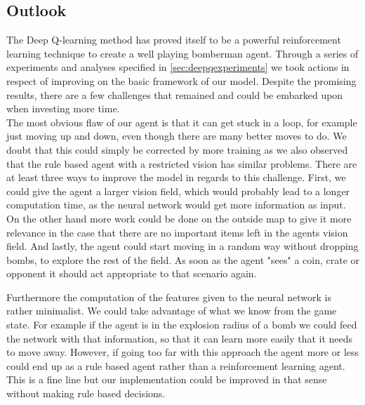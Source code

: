 
\subsection{Outlook}

The Deep Q-learning method has proved itself to be a powerful reinforcement learning technique to create a well playing bomberman agent. Through a series of experiments and analyses specified in \ref{sec:deepqexperiments} we took actions in respect of improving on the basic framework of our model. Despite the promising results, there are a few challenges that remained and could be embarked upon when investing more time. \\

The most obvious flaw of our agent is that it can get stuck in a loop, for example just moving up and down, even though there are many better moves to do. We doubt that this could simply be corrected by more training as we also observed that the rule based agent with a restricted vision has similar problems. There are at least three ways to improve the model in regards to this challenge. First, we could give the agent a larger vision field, which would probably lead to a longer computation time, as the neural network would get more information as input. On the other hand more work could be done on the outside map to give it more relevance in the case that there are no important items left in the agents vision field. And lastly, the agent could start moving in a random way without dropping bombs, to explore the rest of the field. As soon as the agent "sees" a coin, crate or opponent it should act appropriate to that scenario again.

Furthermore the computation of the features given to the neural network is rather minimalist. We could take advantage of what we know from the game state. For example if the agent is in the explosion radius of a bomb we could feed the network with that information, so that it can learn more easily that it needs to move away. However, if going too far with this approach the agent more or less could end up as a rule based agent rather than a reinforcement learning agent. This is a fine line but our implementation could be improved in that sense without making rule based decisions.\\ 

